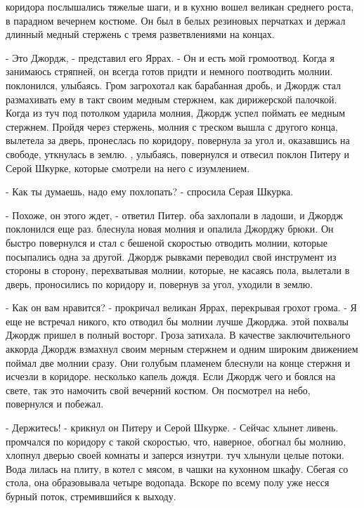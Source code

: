  коридора послышались тяжелые шаги, и в кухню вошел великан 
среднего роста, в парадном вечернем костюме. Он был в белых резиновых 
перчатках и держал длинный медный стержень с тремя разветвлениями на 
концах.
\par- Это Джордж, - представил его Яррах. - Он и есть мой громоотвод. 
Когда я занимаюсь стряпней, он всегда готов придти и немного 
поотводить молнии.
 поклонился, улыбаясь. Гром загрохотал как барабанная дробь, 
и Джордж стал размахивать ему в такт своим медным стержнем, как 
дирижерской палочкой. Когда из туч под потолком ударила молния, Джордж 
успел поймать ее медным стержнем. Пройдя через стержень, молния с 
треском вышла с другого конца, вылетела за дверь, пронеслась по 
коридору, повернула за угол и, оказавшись на свободе, уткнулась в 
землю.
, улыбаясь, повернулся и отвесил поклон Питеру и Серой 
Шкурке, которые смотрели на него с изумлением.
\par- Как ты думаешь, надо ему похлопать? - спросила Серая Шкурка.
\par- Похоже, он этого ждет, - ответил Питер.
 оба захлопали в ладоши, и Джордж поклонился еще раз.
 блеснула новая молния и опалила Джорджу брюки. Он быстро 
повернулся и стал с бешеной скоростью отводить молнии, которые 
посыпались одна за другой. Джордж рывками переводил свой инструмент из 
стороны в сторону, перехватывая молнии, которые, не касаясь пола, 
вылетали в дверь, проносились по коридору и, повернув за угол, уходили 
в землю.
\par- Как он вам нравится? - прокричал великан Яррах, перекрывая 
грохот грома. - Я еще не встречал никого, кто отводил бы молнии лучше 
Джорджа.
 этой похвалы Джордж пришел в полный восторг. Гроза затихала. В 
качестве заключительного аккорда Джордж взмахнул своим мерным стержнем 
и одним широким движением поймал две молнии сразу. Они голубым 
пламенем блеснули на конце стержня и исчезли в коридоре.
 несколько капель дождя. Если Джордж чего и боялся на свете, 
так это намочить свой вечерний костюм. Он посмотрел на небо, 
повернулся и побежал.
\par- Держитесь! - крикнул он Питеру и Серой Шкурке. - Сейчас хлынет 
ливень.
 промчался по коридору с такой скоростью, что, наверное, обогнал 
бы молнию, хлопнул дверью своей комнаты и заперся изнутри.
 туч хлынули целые потоки. Вода лилась на плиту, в котел с 
мясом, в чашки на кухонном шкафу. Сбегая со стола, она образовывала 
четыре водопада. Вскоре по всему полу уже несся бурный поток, 
стремившийся к выходу.
